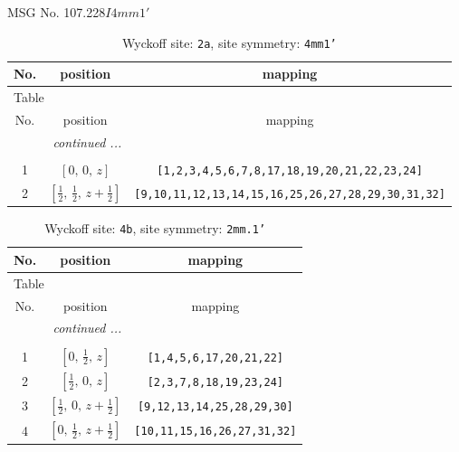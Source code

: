 \documentclass[fleqn,8pt]{jsarticle}
\begin{document}
\setcounter{MaxMatrixCols}{32}

\renewcommand{\tablename}{Table~}
\renewcommand{\figurename}{Figure~}
\begin{center}
\LARGE
MSG No. 107.228\quad$I4mm1'$
\end{center}
\renewcommand{\arraystretch}{1.2}
\begin{longtable}{ccc}
\caption{Wyckoff site: {\tt 2a}, site symmetry: {\tt 4mm1'}}
 \\
 \hline \hline
No. & position & mapping \\ \hline \endfirsthead

\multicolumn{2}{l}{\tablename\ \thetable{}} \\
 \hline \hline
No. & position & mapping \\ \hline \endhead

 \hline \hline
\multicolumn{2}{r}{\footnotesize\it continued ...} \\ \endfoot

 \hline \hline
\multicolumn{2}{r}{} \\ \endlastfoot

1 & $\left[ 0,\, 0,\, z \right]$ & {\tt [1,2,3,4,5,6,7,8,17,18,19,20,21,22,23,24]} \\ \hline
2 & $\left[ \frac{1}{2},\, \frac{1}{2},\, z + \frac{1}{2} \right]$ & {\tt [9,10,11,12,13,14,15,16,25,26,27,28,29,30,31,32]} \\
\end{longtable}
\renewcommand{\arraystretch}{1.2}
\begin{longtable}{ccc}
\caption{Wyckoff site: {\tt 4b}, site symmetry: {\tt 2mm.1'}}
 \\
 \hline \hline
No. & position & mapping \\ \hline \endfirsthead

\multicolumn{2}{l}{\tablename\ \thetable{}} \\
 \hline \hline
No. & position & mapping \\ \hline \endhead

 \hline \hline
\multicolumn{2}{r}{\footnotesize\it continued ...} \\ \endfoot

 \hline \hline
\multicolumn{2}{r}{} \\ \endlastfoot

1 & $\left[ 0,\, \frac{1}{2},\, z \right]$ & {\tt [1,4,5,6,17,20,21,22]} \\ \hline
2 & $\left[ \frac{1}{2},\, 0,\, z \right]$ & {\tt [2,3,7,8,18,19,23,24]} \\ \hline
3 & $\left[ \frac{1}{2},\, 0,\, z + \frac{1}{2} \right]$ & {\tt [9,12,13,14,25,28,29,30]} \\ \hline
4 & $\left[ 0,\, \frac{1}{2},\, z + \frac{1}{2} \right]$ & {\tt [10,11,15,16,26,27,31,32]} \\
\end{longtable}
\end{document}

